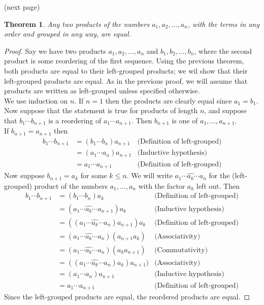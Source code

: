 \documentclass{report}
\newtheorem*{theorem}{Theorem}
\theoremstyle{definition}
\begin{document}
\noindent(next page)\newpage
\begin{theorem}
Any two products of the numbers $a_1,a_2,\ldots,a_n$, with the terms in any order and grouped in any way, are equal.
\end{theorem}
\begin{proof}
Say we have two products $a_1,a_2,\ldots,a_n$ and $b_1,b_2,\ldots,b_n$, where the second product is some reordering of the first
sequence. Using the previous theorem, both products are equal to their left-grouped products; we wil show that
their left-grouped products are equal. As in the previous proof, we will assume that products are written as left-grouped unless
specified otherwise.\\
\indent We use induction on $n$. If $n=1$ then the products are clearly equal since $a_1=b_1$. Now suppose that
the statement is true for products of length $n$, and suppose that $b_1\cdots b_{n+1}$ is a reordering of $a_1\cdots a_{n+1}$.
Then $b_{n+1}$ is one of $a_1,\ldots,a_{n+1}$.\\
\indent If $b_{n+1}=a_{n+1}$ then 
\begin{align*}
b_1\cdots b_{n+1}&=(b_1\cdots b_{n})a_{n+1}&\text{(Definition of left-grouped)}\\
&=(a_1\cdots a_n)a_{n+1}&\text{(Inductive hypothesis)}\\
&=a_1\cdots a_{n+1}&\text{(Definition of left-grouped)}
\end{align*}
Now suppose $b_{n+1}=a_k$ for some $k\leq n$. We will write $a_1\cdots\hat{a_k}\cdots a_n$ for the (left-grouped) product of the
numbers $a_1,\ldots,a_n$ with the factor $a_k$ left out. Then
\begin{align*}
b_1\cdots b_{n+1}&=(b_1\cdots b_{n})a_k&\text{(Definition of left-grouped)}\\
&=(a_1\cdots\hat{a_k}\cdots a_{n+1})a_k&\text{(Inductive hypothesis)}\\
&=((a_1\cdots\hat{a_k}\cdots a_n)a_{n+1})a_k&\text{(Definition of left-grouped)}\\
&=(a_1\cdots\hat{a_k}\cdots a_n)(a_{n+1}a_k)&\text{(Associativity)}\\
&=(a_1\cdots\hat{a_k}\cdots a_n)(a_ka_{n+1})&\text{(Commutativity)}\\
&=((a_1\cdots\hat{a_k}\cdots a_n)a_k)a_{n+1})&\text{(Associativity)}\\
&=(a_1\cdots a_n)a_{n+1}&\text{(Inductive hypothesis)}\\
&=a_1\cdots a_{n+1}&\text{(Definition of left-grouped)}
\end{align*}
Since the left-grouped products are equal, the reordered products are equal.
\end{proof}
\newpage
\end{document}
